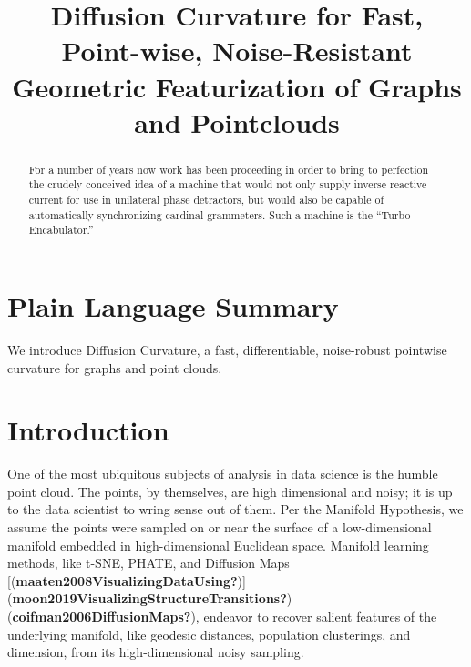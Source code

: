 \documentclass[
]{agujournal2019}
\begin{document}
\title{Diffusion Curvature for Fast, Point-wise, Noise-Resistant
Geometric Featurization of Graphs and Pointclouds}



\begin{abstract}
For a number of years now work has been proceeding in order to bring to
perfection the crudely conceived idea of a machine that would not only
supply inverse reactive current for use in unilateral phase detractors,
but would also be capable of automatically synchronizing cardinal
grammeters. Such a machine is the ``Turbo-Encabulator.''
\end{abstract}

\section*{Plain Language Summary}
We introduce Diffusion Curvature, a fast, differentiable, noise-robust
pointwise curvature for graphs and point clouds.



\section{Introduction}\label{introduction}

One of the most ubiquitous subjects of analysis in data science is the
humble point cloud. The points, by themselves, are high dimensional and
noisy; it is up to the data scientist to wring sense out of them. Per
the Manifold Hypothesis, we assume the points were sampled on or near
the surface of a low-dimensional manifold embedded in high-dimensional
Euclidean space. Manifold learning methods, like t-SNE, PHATE, and
Diffusion Maps
{[}(\textbf{maaten2008VisualizingDataUsing?}){]}(\textbf{moon2019VisualizingStructureTransitions?})(\textbf{coifman2006DiffusionMaps?}),
endeavor to recover salient features of the underlying manifold, like
geodesic distances, population clusterings, and dimension, from its
high-dimensional noisy sampling.
\end{document}
